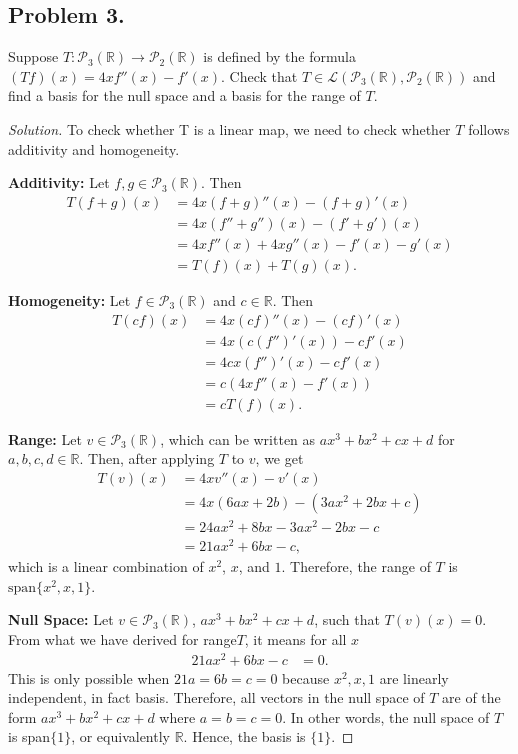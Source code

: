 \documentclass{article}
\begin{document}
\newpage
\subsection*{Problem 3.}
Suppose $T: {\mathcal{P} }_3(\mathbb{R}) \to {\mathcal{P} }_2(\mathbb{R})$ is defined by the 
formula $(Tf)(x)=4xf''(x)-f'(x)$. Check that
$T\in {\mathcal{L} } ({\mathcal{P} }_3(\mathbb{R}), {\mathcal{P} }_2(\mathbb{R}))$ and find a 
basis for the null space and a basis for the range of $T$.
\begin{proof}[Solution]
    To check whether T is a linear map, we need to check whether $T$ follows additivity and
    homogeneity. 
    
    \textbf{Additivity:} Let $f,g\in{\mathcal{P} }_3(\mathbb{R})$. Then
    \begin{align*}
        T(f+g)(x) &= 4x(f+g)''(x) - (f+g)'(x) \\
        &= 4x(f''+g'')(x) - (f'+g')(x) \\
        &= 4xf''(x) + 4xg''(x) - f'(x) - g'(x) \\
        &= T(f)(x) + T(g)(x).
    \end{align*}

    \textbf{Homogeneity:} Let $f\in{\mathcal{P} }_3(\mathbb{R})$ and $c\in\mathbb{R}$. Then
    \begin{align*}
        T(cf)(x) &= 4x(cf)''(x) - (cf)'(x) \\
        &= 4x(c(f'')'(x)) - cf'(x) \\
        &= 4cx(f'')'(x) - cf'(x) \\
        &= c(4xf''(x) - f'(x)) \\
        &= cT(f)(x).
    \end{align*}

    \textbf{Range:} Let $v\in\mathcal{P}_3(\mathbb{R})$, which can be written as
    $ax^3 + bx^2 + cx + d$ for $a,b,c,d\in\mathbb{R}$. Then, after applying $T$ to $v$, we get 
    \begin{align*}
        T(v)(x) &= 4xv''(x) - v'(x) \\
        &= 4x(6ax + 2b) - (3ax^2 + 2bx + c) \\
        &= 24ax^2 + 8bx - 3ax^2 - 2bx - c \\
        &= 21ax^2 + 6bx - c,
    \end{align*}
    which is a linear combination of $x^2$, $x$, and $1$. Therefore, the range of $T$ is 
    $\mathrm{span}\{x^2, x, 1\}$.

    \textbf{Null Space:} Let $v\in\mathcal{P}_3(\mathbb{R})$, $ax^3 + bx^2 + cx + d$, such that 
    $T(v)(x) = 0$. From what we have derived for range$T$, it means for all $x$
    \begin{align*}
        21ax^2 + 6bx - c &= 0.
    \end{align*}
    This is only possible when $21a = 6b = c = 0$ because $x^2, x, 1$ are linearly independent, in 
    fact basis. Therefore, all vectors in the null space of $T$ are of the form $ax^3 + bx^2 + cx + d$
    where $a=b=c=0$. In other words, the null space of $T$ is span$\{1\}$, or equivalently 
    $\mathbb{R}$. Hence, the basis is $\{1\}$.
\end{proof}
\end{document}
